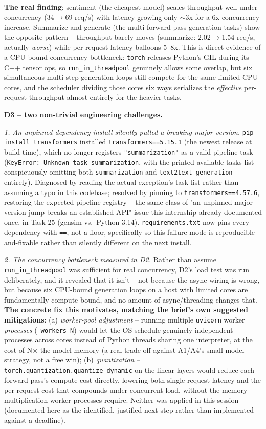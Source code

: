 \documentclass[11pt,a4paper]{article}
\begin{document}
\textbf{The real finding}: sentiment (the cheapest model) scales throughput well under
concurrency (34$\to$69 req/s) with latency growing only $\sim$3x for a 6x concurrency
increase. Summarize and generate (the multi-forward-pass generation tasks) show the opposite
pattern -- throughput barely moves (summarize: 2.02$\to$1.54 req/s, actually \emph{worse})
while per-request latency balloons 5--8x. This is direct evidence of a CPU-bound concurrency
bottleneck: \texttt{torch} releases Python's GIL during its C++ tensor ops, so
\texttt{run\_in\_threadpool} genuinely allows some overlap, but six simultaneous multi-step
generation loops still compete for the same limited CPU cores, and the scheduler dividing
those cores six ways serializes the \emph{effective} per-request throughput almost entirely
for the heavier tasks.

\textbf{D3 -- two non-trivial engineering challenges.}

\emph{1. An unpinned dependency install silently pulled a breaking major version.}
\texttt{pip install transformers} installed \texttt{transformers==5.15.1} (the newest release
at build time), which no longer registers \texttt{"summarization"} as a valid pipeline task
(\texttt{KeyError: Unknown task summarization}, with the printed available-tasks list
conspicuously omitting both \texttt{summarization} and \texttt{text2text-\allowbreak generation}
entirely). Diagnosed by reading the actual exception's task list rather than assuming a typo
in this codebase; resolved by pinning to \texttt{transformers==4.57.6}, restoring the expected
pipeline registry -- the same class of "an unpinned major-version jump breaks an established
API" issue this internship already documented once, in Task 25 (gensim vs.\ Python 3.14).
\texttt{requirements.txt} now pins every dependency with \texttt{==}, not a floor, specifically
so this failure mode is reproducible-and-fixable rather than silently different on the next
install.

\emph{2. The concurrency bottleneck measured in D2.} Rather than assume
\texttt{run\_in\_threadpool} was sufficient for real concurrency, D2's load test was run
deliberately, and it revealed that it isn't -- not because the async wiring is wrong, but
because six CPU-bound generation loops on a host with limited cores are fundamentally
compute-bound, and no amount of async/threading changes that. \textbf{The concrete fix this
motivates, matching the brief's own suggested mitigations}: (a) \emph{worker-pool adjustment}
-- running multiple \texttt{uvicorn} worker \emph{processes} (\texttt{--workers N}) would let
the OS schedule genuinely independent processes across cores instead of Python threads sharing
one interpreter, at the cost of N$\times$ the model memory (a real trade-off against A1/A4's
small-model strategy, not a free win); (b) \emph{quantization} --
\texttt{torch.quantization.quantize\_dynamic} on the linear layers would reduce each forward
pass's compute cost directly, lowering both single-request latency and the per-request cost
that compounds under concurrent load, without the memory multiplication worker processes
require. Neither was applied in this session (documented here as the identified, justified
next step rather than implemented against a deadline).
\end{document}

